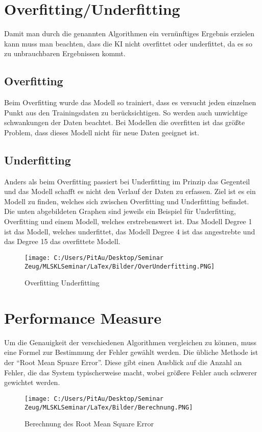 \section{Overfitting/Underfitting}
\label{sec:overfittingUnderfitting}
Damit man durch die genannten Algorithmen ein vernünftiges Ergebnis erzielen kann muss man beachten, dass die KI nicht overfittet oder underfittet, da es so zu unbrauchbaren Ergebnissen kommt.


\subsection{Overfitting}
\label{sec:overfitting}
Beim Overfitting wurde das Modell so trainiert, dass es versucht jeden einzelnen Punkt aus den Trainingsdaten zu berücksichtigen. So werden auch unwichtige schwankungen der Daten beachtet. Bei Modellen die overfitten ist das größte Problem, dass dieses Modell nicht für neue Daten geeignet ist\cite[S.~214.]{WML}.


\subsection{Underfitting}
\label{sec:underfitting}
Anders als beim Overfitting passiert bei Underfitting im Prinzip das Gegenteil und das Modell schafft es nicht den Verlauf der Daten zu erfassen\cite[S.~214.]{WML}.
Ziel ist es ein Modell zu finden, welches sich zwischen Overfitting und Underfitting befindet. Die unten abgebildeten Graphen sind jeweils ein Beispiel für Underfitting, Overfitting und einem Modell, welches erstrebenswert ist. Das Modell Degree 1 ist das Modell, welches underfittet, das Modell Degree 4 ist das angestrebte und das Degree 15 das overfittete Modell.
\newline
\begin{figure}
	\texttt{[image: C:/Users/PitAu/Desktop/Seminar Zeug/MLSKLSeminar/LaTex/Bilder/OverUnderfitting.PNG]}
	\caption{Overfitting Underfitting}
\end{figure}


\section{Performance Measure}
\label{sec:performanceMeasure}
Um die Genauigkeit der verschiedenen Algorithmen vergleichen zu können, muss eine Formel zur Bestimmung der Fehler gewählt werden. 
Die übliche Methode ist der “Root Mean Spuare Error”. Diese gibt einen Ausblick auf die Anzahl an Fehler, die das System typischerweise macht, wobei größere Fehler auch schwerer gewichtet werden\cite[S.~39.]{AG}.
\newline
\begin{figure}
	\texttt{[image: C:/Users/PitAu/Desktop/Seminar Zeug/MLSKLSeminar/LaTex/Bilder/Berechnung.PNG]}
	\caption{Berechnung des Root Mean Square Error}
\end{figure}


